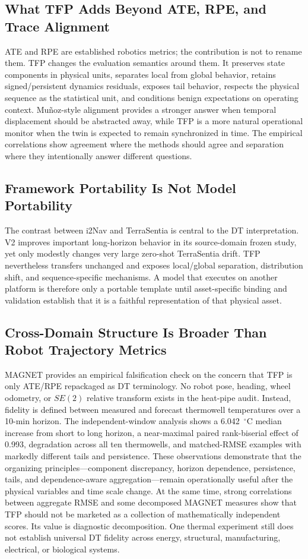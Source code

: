 \documentclass[journal]{IEEEtran}
\begin{document}
\subsection{What TFP Adds Beyond ATE, RPE, and Trace Alignment}
ATE and RPE are established robotics metrics; the contribution is not to rename them. TFP changes the evaluation semantics around them. It preserves state components in physical units, separates local from global behavior, retains signed/persistent dynamics residuals, exposes tail behavior, respects the physical sequence as the statistical unit, and conditions benign expectations on operating context. Mu\~noz-style alignment provides a stronger answer when temporal displacement should be abstracted away, while TFP is a more natural operational monitor when the twin is expected to remain synchronized in time. The empirical correlations show agreement where the methods should agree and separation where they intentionally answer different questions.

\subsection{Framework Portability Is Not Model Portability}
The contrast between i2Nav and TerraSentia is central to the DT interpretation. V2 improves important long-horizon behavior in its source-domain frozen study, yet only modestly changes very large zero-shot TerraSentia drift. TFP nevertheless transfers unchanged and exposes local/global separation, distribution shift, and sequence-specific mechanisms. A model that executes on another platform is therefore only a portable template until asset-specific binding and validation establish that it is a faithful representation of that physical asset.


\subsection{Cross-Domain Structure Is Broader Than Robot Trajectory Metrics}
MAGNET provides an empirical falsification check on the concern that TFP is only ATE/RPE repackaged as DT terminology. No robot pose, heading, wheel odometry, or $SE(2)$ relative transform exists in the heat-pipe audit. Instead, fidelity is defined between measured and forecast thermowell temperatures over a 10-min horizon. The independent-window analysis shows a 6.042~$^{\circ}$C median increase from short to long horizon, a near-maximal paired rank-biserial effect of 0.993, degradation across all ten thermowells, and matched-RMSE examples with markedly different tails and persistence. These observations demonstrate that the organizing principles---component discrepancy, horizon dependence, persistence, tails, and dependence-aware aggregation---remain operationally useful after the physical variables and time scale change. At the same time, strong correlations between aggregate RMSE and some decomposed MAGNET measures show that TFP should not be marketed as a collection of mathematically independent scores. Its value is diagnostic decomposition. One thermal experiment still does not establish universal DT fidelity across energy, structural, manufacturing, electrical, or biological systems.
\end{document}

